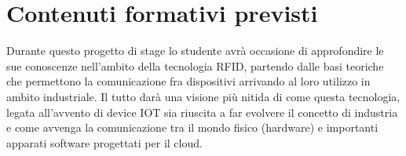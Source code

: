 \section*{Contenuti formativi previsti}
Durante questo progetto di stage lo studente avrà occasione di approfondire le sue conoscenze nell'ambito della tecnologia RFID,
partendo dalle basi teoriche che permettono la comunicazione fra dispositivi arrivando al loro utilizzo in ambito industriale.
Il tutto darà una visione più nitida di come questa tecnologia, legata all'avvento di device IOT sia riuscita a far evolvere il concetto di
industria e come avvenga la comunicazione tra il mondo fisico (hardware) e importanti apparati software progettati per il cloud.
\newpage